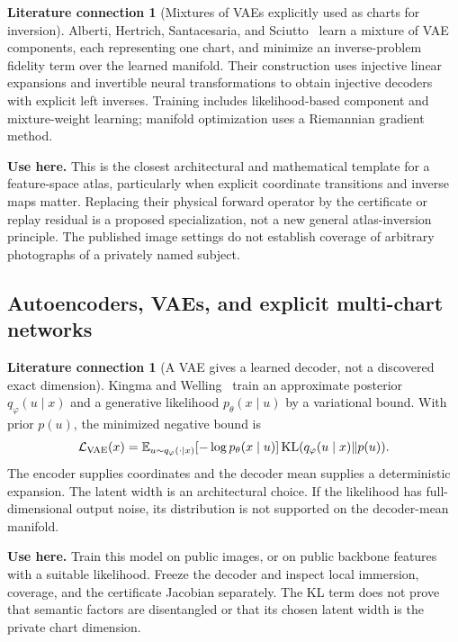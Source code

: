 \documentclass[11pt,a4paper]{article}
\theoremstyle{definition}
\theoremstyle{definition}
\newtheorem{literature}[theorem]{Literature connection}
\theoremstyle{remark}\newtheorem{remark}[theorem]{Remark}
\begin{document}
\begin{literature}[Mixtures of VAEs explicitly used as charts for inversion]\label{lit:mixture}
Alberti, Hertrich, Santacesaria, and Sciutto~\cite{mixturevae} learn a mixture of VAE components, each representing one chart, and minimize an inverse-problem fidelity term over the learned manifold. Their construction uses injective linear expansions and invertible neural transformations to obtain injective decoders with explicit left inverses. Training includes likelihood-based component and mixture-weight learning; manifold optimization uses a Riemannian gradient method.

\textbf{Use here.} This is the closest architectural and mathematical template for a feature-space atlas, particularly when explicit coordinate transitions and inverse maps matter. Replacing their physical forward operator by the certificate or replay residual is a proposed specialization, not a new general atlas-inversion principle. The published image settings do not establish coverage of arbitrary photographs of a privately named subject.
\end{literature}

\subsection{Autoencoders, VAEs, and explicit multi-chart networks}

\begin{literature}[A VAE gives a learned decoder, not a discovered exact dimension]\label{lit:vae}
Kingma and Welling~\cite{vae} train an approximate posterior $q_\varphi(u\mid x)$ and a generative likelihood $p_\theta(x\mid u)$ by a variational bound. With prior $p(u)$, the minimized negative bound is
\[
\mathcal L_{\rm VAE}(x)=
\mathbb E_{u\sim q_\varphi(\cdot\mid x)}[-\log p_\theta(x\mid u)]
\operatorname{KL}(q_\varphi(u\mid x)\Vert p(u)).
\]
The encoder supplies coordinates and the decoder mean supplies a deterministic expansion. The latent width is an architectural choice. If the likelihood has full-dimensional output noise, its distribution is not supported on the decoder-mean manifold.

\textbf{Use here.} Train this model on public images, or on public backbone features with a suitable likelihood. Freeze the decoder and inspect local immersion, coverage, and the certificate Jacobian separately. The KL term does not prove that semantic factors are disentangled or that its chosen latent width is the private chart dimension.
\end{literature}
\end{document}
